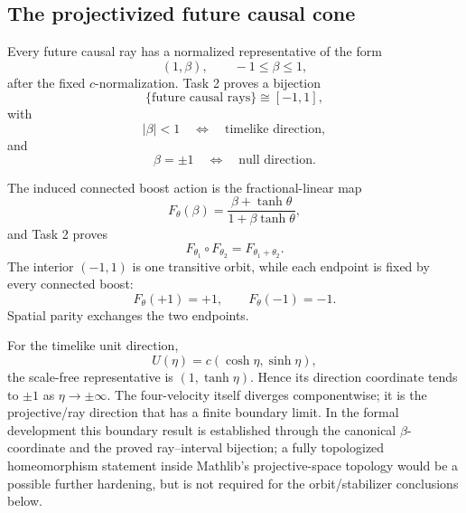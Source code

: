 \documentclass[11pt,a4paper]{article}
\begin{document}
\subsection{The projectivized future causal cone}

Every future causal ray has a normalized representative of the form
\begin{equation}
 (1,\beta),
 \qquad -1\le\beta\le1,
\end{equation}
after the fixed $c$-normalization.  Task 2 proves a bijection
\begin{equation}
 \{\text{future causal rays}\}\cong[-1,1],
\end{equation}
with
\begin{equation}
 |\beta|<1
 \quad\Longleftrightarrow\quad
 \text{timelike direction},
\end{equation}
and
\begin{equation}
 \beta=\pm1
 \quad\Longleftrightarrow\quad
 \text{null direction}.
\end{equation}

The induced connected boost action is the fractional-linear map
\begin{equation}
 F_\theta(\beta)
 =\frac{\beta+\tanh\theta}{1+\beta\tanh\theta},
\label{eq:Ftheta}
\end{equation}
and Task 2 proves
\begin{equation}
 F_{\theta_1}\circ F_{\theta_2}=F_{\theta_1+\theta_2}.
\end{equation}
The interior $(-1,1)$ is one transitive orbit, while each endpoint is fixed by every connected boost:
\begin{equation}
 F_\theta(+1)=+1,
 \qquad
 F_\theta(-1)=-1.
\end{equation}
Spatial parity exchanges the two endpoints.

For the timelike unit direction,
\begin{equation}
 U(\eta)=c(\cosh\eta,\sinh\eta),
\end{equation}
the scale-free representative is $(1,\tanh\eta)$.  Hence its direction coordinate tends to $\pm1$ as $\eta\to\pm\infty$.  The four-velocity itself diverges componentwise; it is the projective/ray direction that has a finite boundary limit.  In the formal development this boundary result is established through the canonical $\beta$-coordinate and the proved ray--interval bijection; a fully topologized homeomorphism statement inside Mathlib's projective-space topology would be a possible further hardening, but is not required for the orbit/stabilizer conclusions below.
\end{document}
